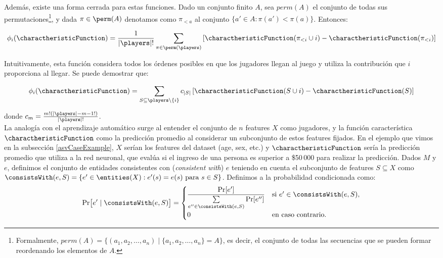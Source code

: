 Además, existe una forma cerrada para estas funciones. Dado un conjunto finito $A$, sea $perm(A)$ el conjunto de todas sus permutaciones\footnote{Formalmente, $perm(A) = \{(a_1, a_2, \dots, a_n) \mid \{a_1, a_2, \dots, a_n\} = A\}$, es decir, el conjunto de todas las secuencias que se pueden formar reordenando los elementos de $A$.}, y dada $\pi \in \perm(A)$ denotamos como $\pi_{<a}$ al conjunto $\{a' \in A : \pi(a') < \pi(a)\}$. Entonces:

\begin{align}\label{eq:shapley_values_by_perm}
    \phi_i(\charactheristicFunction) = \frac{1}{|\players|!} \sum_{\pi \in \perm(\players)} \left[\charactheristicFunction(\pi_{<i} \cup {i}) - \charactheristicFunction(\pi_{<i})\right]
\end{align}

Intuitivamente, esta función considera todos los órdenes posibles en que los jugadores llegan al juego y utiliza la contribución que $i$ proporciona al llegar. Se puede demostrar que:

\begin{align*}
    \phi_i(\charactheristicFunction) = \sum_{S \subseteq \players \setminus \{i\}} c_{|S|}\left[\charactheristicFunction(S \cup {i}) - \charactheristicFunction(S)\right]
\end{align*}

donde $c_m = \frac{m! (|\players|-m-1!)}{|\players|!}$.\\

La analogía con el aprendizaje automático surge al entender el conjunto de \(n\) features \(X\) como jugadores, y la función característica \(\charactheristicFunction\) como la predicción promedio al considerar un subconjunto de estos features fijados. En el ejemplo que vimos en la subsección \ref{asvCaseExample}, $X$ serían los features del dataset (age, sex, etc.) y $\charactheristicFunction$ sería la predicción promedio que utiliza a la  red neuronal, que evalúa si el ingreso de una persona es superior a \$50\,000 para realizar la predicción. Dados \(M\) y \(e\), definimos el conjunto de entidades consistentes con (\textit{consistent with}) \(e\) teniendo en cuenta el subconjunto de features \(S \subseteq X\) como \(\consistsWith(e, S) = \{e' \in \entities(X) : e'(s) = e(s) \text{ para } s \in S\}\). Definimos a la probabilidad condicionada como: %
\[
\Pr\bigl[e' \mid \consistsWith(e,S)\bigr] =
\begin{cases}
\displaystyle \frac{\Pr[e']}{\sum\limits_{e'' \in \consistsWith(e,S)} \Pr[e'']} & \text{si } e' \in \consistsWith(e,S), \\
0 & \text{en caso contrario}.
\end{cases}
\]


